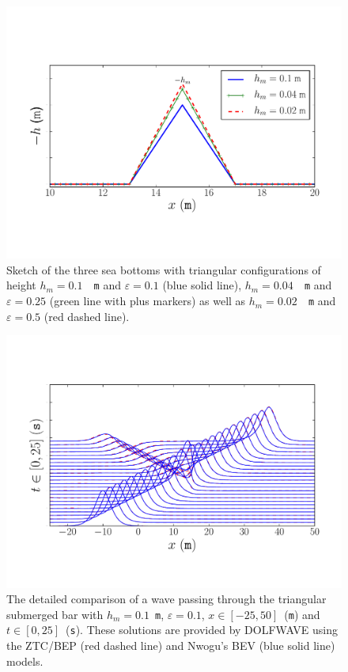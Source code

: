 \begin{figure}
\begin{center}
\includegraphics[width=\largefig]{chapters/lopes/pdf/deptheps.pdf}
\end{center}
\caption{Sketch of the three sea bottoms with triangular
configurations of height $h_m=0.1$~{\tt
m} and $\varepsilon=0.1$ (blue solid line),
 $h_m=0.04$~{\tt
m}  and $\varepsilon=0.25$ (green line with plus markers)  as
well as  $h_m=0.02$~{\tt
m} and $\varepsilon=0.5$ (red dashed line).}
\label{fig:lopes:spikes}
\end{figure}
\begin{figure}
\begin{center}
\includegraphics[width=\largefig]{chapters/lopes/pdf/epsilon0_1.pdf}
\end{center}
\caption{The detailed comparison of a wave passing through the
 triangular submerged bar with $h_m=0.1$~{\tt m},
 $\varepsilon=0.1$, $x\in[-25,50]$~({\tt m}) and
 $t\in[0,25]$~({\tt s}).  These solutions are provided by
 DOLFWAVE using the ZTC/BEP (red dashed line) and Nwogu's
 BEV (blue solid line) models.}
\label{fig:lopes:znspike01}
\end{figure}

